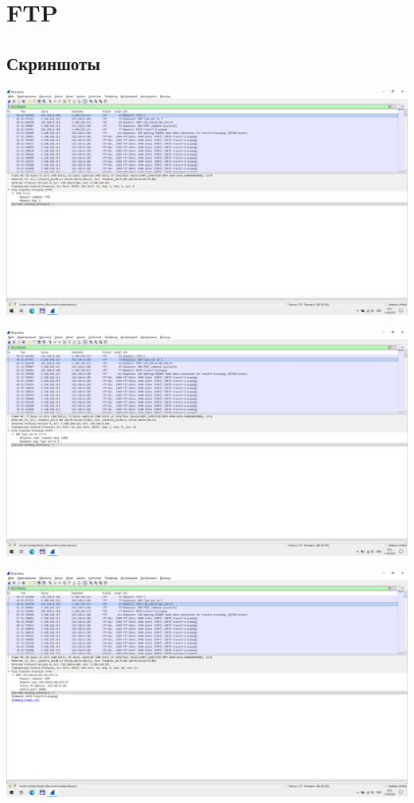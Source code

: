 
\section{FTP}

\subsection{Скриншоты}

\begin{center}

    \includegraphics[width=\textwidth]{screenshots/ftp_type_I_request_1}

    \includegraphics[width=\textwidth]{screenshots/ftp_type_I_response_1}

    \includegraphics[width=\textwidth]{screenshots/ftp_port_request_1}


\end{center}
